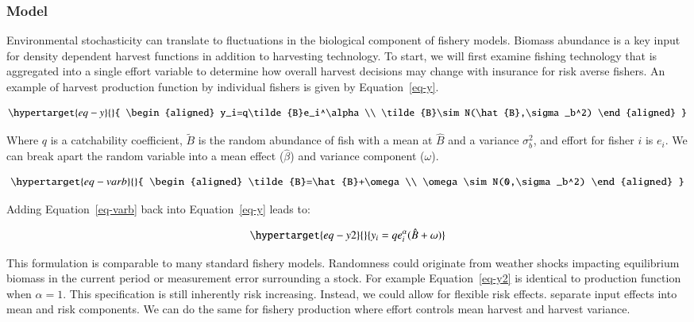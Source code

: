 \documentclass[
  super,
  preprint,
  3p]{elsarticle}
\theoremstyle{plain}
\theoremstyle{plain}
\theoremstyle{remark}
\begin{document}
\hypertarget{model}{%
\subsubsection{Model}\label{model}}

Environmental stochasticity can translate to fluctuations in the
biological component of fishery models. Biomass abundance is a key input
for density dependent harvest functions in addition to harvesting
technology. To start, we will first examine fishing technology that is
aggregated into a single effort variable to determine how overall
harvest decisions may change with insurance for risk averse fishers. An
example of harvest production function by individual fishers is given by
Equation~\ref{eq-y}.

\begin{equation}\protect\hypertarget{eq-y}{}{
\begin{aligned}
y_i=q\tilde{B}e_i^\alpha\\
\tilde{B}\sim N(\hat{B},\sigma_b^2)
\end{aligned}
}\label{eq-y}\end{equation}

Where \(q\) is a catchability coefficient, \(\tilde{B}\) is the random
abundance of fish with a mean at \(\hat{B}\) and a variance
\(\sigma_b^2\), and effort for fisher \(i\) is \(e_i\). We can break
apart the random variable into a mean effect (\(\hat{\beta}\)) and
variance component (\(\omega\)).

\begin{equation}\protect\hypertarget{eq-varb}{}{
\begin{aligned}
\tilde{B}=\hat{B}+\omega \\
\omega\sim N(0,\sigma_b^2)
\end{aligned}
}\label{eq-varb}\end{equation}

Adding Equation~\ref{eq-varb} back into Equation~\ref{eq-y} leads to:

\begin{equation}\protect\hypertarget{eq-y2}{}{
\begin{aligned}
y_i=qe_i^\alpha(\hat{B}+\omega)
\end{aligned}
}\label{eq-y2}\end{equation}

This formulation is comparable to many standard fishery models.
Randomness could originate from weather shocks impacting equilibrium
biomass in the current period or measurement error surrounding a stock.
For example Equation~\ref{eq-y2} is identical to \citet{Tilman2018}
production function when \(\alpha=1\). This specification is still
inherently risk increasing. Instead, we could allow for flexible risk
effects. \citet{Just1979} separate input effects into mean and risk
components. We can do the same for fishery production where effort
controls mean harvest and harvest variance.
\end{document}
